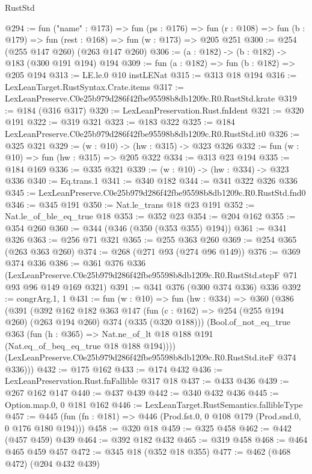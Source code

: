 \begin{lexlean}{RustStd}
\begin{coremodule}
@294 := fun ("name" : @173) =>
  fun (ps : @176) =>
  fun (r : @108) => fun (b : @179) => fun (rest : @168) => fun (w : @173) => @205 @251
@300 := @254 (@255 @147 @260) (@263 @147 @260)
@306 := (a : @182) -> (b : @182) -> @183 (@300 @191 @194) @194
@309 := fun (a : @182) => fun (b : @182) => @205 @194
@313 := LE.le.{0} @10 instLENat
@315 := @313 @18 @194
@316 := LexLeanTarget.RustSyntax.Crate.items
@317 := LexLeanPreserve.C0e25b979d286f42fbe95598b8db1209c.R0.RustStd.krate
@319 := @184 (@316 @317)
@320 := LexLeanPreservation.Rust.fnIdent
@321 := @320 @191
@322 := @319 @321
@323 := @183 @322
@325 := @184 LexLeanPreserve.C0e25b979d286f42fbe95598b8db1209c.R0.RustStd.it0
@326 := @325 @321
@329 := (w : @10) -> (hw : @315) -> @323 @326
@332 := fun (w : @10) => fun (hw : @315) => @205 @322
@334 := @313 @23 @194
@335 := @184 @169
@336 := @335 @321
@339 := (w : @10) -> (hw : @334) -> @323 @336
@340 := Eq.trans.{1}
@341 := @340 @182
@344 := @341 @322 @326 @336
@345 := LexLeanPreserve.C0e25b979d286f42fbe95598b8db1209c.R0.RustStd.fnd0
@346 := @345 @191
@350 := Nat.le_trans @18 @23 @191
@352 := Nat.le_of_ble_eq_true @18
@353 := @352 @23
@354 := @204 @162
@355 := @354 @260
@360 := @344 (@346 (@350 (@353 @355) @194))
@361 := @341 @326
@363 := @256 @71 @321
@365 := @255 @363 @260
@369 := @254 @365 (@263 @363 @260)
@374 := @268 (@271 @93 (@274 @96 @149))
@376 := @369 @374 @336
@386 := @361
    @376
    @336
    (LexLeanPreserve.C0e25b979d286f42fbe95598b8db1209c.R0.RustStd.stepF @71 @93 @96 @149 @169 @321)
@391 := @341 @376 (@300 @374 @336) @336
@392 := congrArg.{1, 1}
@431 := fun (w : @10) =>
  fun (hw : @334) =>
  @360
    (@386
      (@391
        (@392
          @162
          @182
          @363
          @147
          (fun (c : @162) => @254 (@255 @194 @260) (@263 @194 @260) @374 (@335 (@320 @188)))
          (Bool.of_not_eq_true
            @363
            (fun (h : @365) => Nat.ne_of_lt @18 @188 @191 (Nat.eq_of_beq_eq_true @18 @188 @194))))
        (LexLeanPreserve.C0e25b979d286f42fbe95598b8db1209c.R0.RustStd.iteF @374 @336)))
@432 := @175 @162
@433 := @174 @432
@436 := LexLeanPreservation.Rust.fnFallible @317 @18
@437 := @433 @436
@439 := @267 @162 @147
@440 := @437 @439
@442 := @340 @432 @436
@445 := Option.map.{0, 0} @181 @162
@446 := LexLeanTarget.RustSemantics.fallibleType
@457 := @445 (fun (fn : @181) => @446 (Prod.fst.{0, 0} @108 @179 (Prod.snd.{0, 0} @176 @180 @194)))
@458 := @320 @18
@459 := @325 @458
@462 := @442 (@457 @459) @439
@464 := @392 @182 @432
@465 := @319 @458
@468 := @464 @465 @459 @457
@472 := @345 @18 (@352 @18 @355)
@477 := @462 (@468 @472) (@204 @432 @439)

\end{coremodule}
\end{lexlean}

